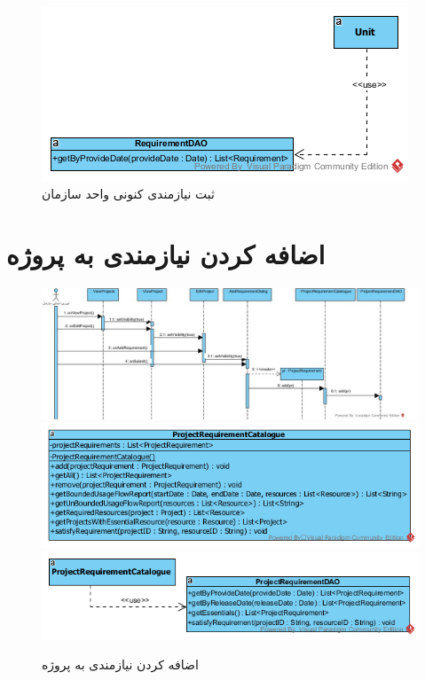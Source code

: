 \begin{landscape}
\begin{figure}[H]
	\includegraphics[scale=0.7]{img/sequence-design/AddRequirementToUnitD}
	\caption{ثبت نیازمندی کنونی واحد سازمان}
\end{figure}
\end{landscape}

\newpage
\section{اضافه کردن نیازمندی به پروژه}
\begin{figure}[H]
	\centering
	\includegraphics[scale=0.65]{img/sequence-design/AddRequirementToProject}
	\includegraphics[scale=0.7]{img/sequence-design/AddRequirementToProjectC}
	\includegraphics[scale=0.7]{img/sequence-design/AddRequirementToProjectD}
	\caption{اضافه کردن نیازمندی به پروژه}
\end{figure}

